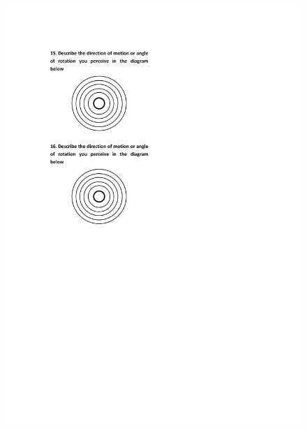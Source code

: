 \begin{figure}[h]
\centering
\includegraphics[width=1\textwidth,height=0.7\textheight]{A_thesis/appendix/Experiment1_questionnaire-4.png}
\end{figure}
\newpage

